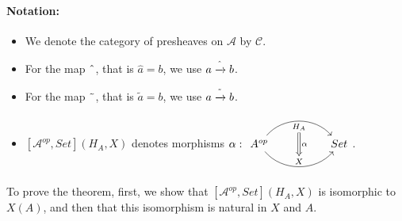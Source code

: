 \documentclass[18pt,a4paper]{article}
\theoremstyle{definition}
\begin{document}
\paragraph{Notation:} \begin{itemize}
	\item We denote the category of presheaves on $\mathcal{A}$ by $\mathcal{C}$.
	\item For the map $\string ^ $, that is $\hat a = b$,
		we use $a \xrightarrow{ \string ^ } b$.
	\item For the map $\string ~ $, that is $\tilde a = b$,
		we use $a \xrightarrow{\string ~} b$.
	\item $[ \mathcal{A}^{op},Set](	H_A,X) $ denotes morphisms $\alpha: \begin{tikzcd}[row sep=large, column sep=huge]
				A^{op} \arrow[r,bend left=50, "H_A"{name=U, below}]
					\arrow[r, bend right = 50, "X"{name=D, above}]
					& Set
					\arrow[Rightarrow, from=U , to=D, "\alpha"]
		\end{tikzcd}$.

\end{itemize}

To prove the theorem,
first, we show that $[ \mathcal{A} ^{op}, Set](H_A,X)$ is isomorphic to $X(A)$,
and then that this isomorphism is natural in $X$ and $A$.
\end{document}
